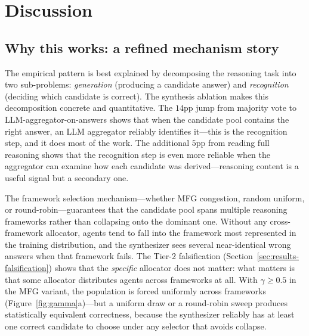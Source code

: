 \documentclass[11pt]{amsart}
\newcommand{\g}{\gamma}
\newcommand\1{{\mathds{1}}}
\theoremstyle{definition}
\theoremstyle{remark}
\numberwithin{equation}{section}
\begin{document}
\section{Discussion}\label{sec:discussion}

\subsection{Why this works: a refined mechanism story}\label{sec:why}

The empirical pattern is best explained by decomposing the reasoning task into two sub-problems: \emph{generation} (producing a candidate answer) and \emph{recognition} (deciding which candidate is correct).
The synthesis ablation makes this decomposition concrete and quantitative.
The $14$pp jump from majority vote to LLM-aggregator-on-answers shows that when the candidate pool contains the right answer, an LLM aggregator reliably identifies it---this is the recognition step, and it does most of the work.
The additional $5$pp from reading full reasoning shows that the recognition step is even more reliable when the aggregator can examine how each candidate was derived---reasoning content is a useful signal but a secondary one.

The framework selection mechanism---whether MFG congestion, random uniform, or round-robin---guarantees that the candidate pool spans multiple reasoning frameworks rather than collapsing onto the dominant one.
Without any cross-framework allocator, agents tend to fall into the framework most represented in the training distribution, and the synthesizer sees several near-identical wrong answers when that framework fails.
The Tier-2 falsification (Section~\ref{sec:results-falsification}) shows that the \emph{specific} allocator does not matter: what matters is that some allocator distributes agents across frameworks at all.
With $\g \ge 0.5$ in the MFG variant, the population is forced uniformly across frameworks (Figure~\ref{fig:gamma}a)---but a uniform draw or a round-robin sweep produces statistically equivalent correctness, because the synthesizer reliably has at least one correct candidate to choose under any selector that avoids collapse.
\end{document}
